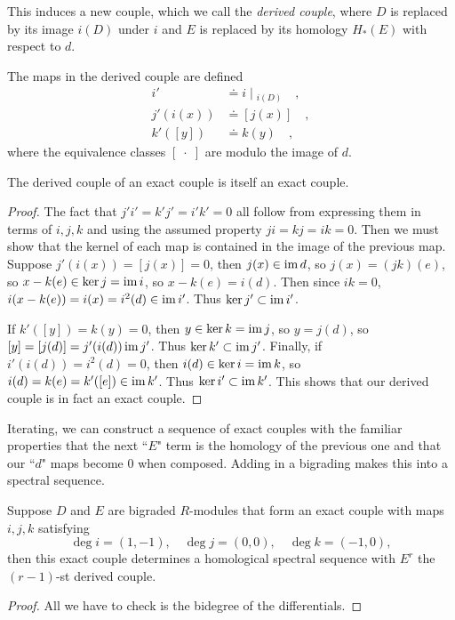 \documentclass[twoside,10pt]{article}
\begin{document}
This induces a new couple, which we call the \textit{derived couple}, where $D$ is replaced by its image $i(D)$ under $i$ and $E$ is replaced by its homology $H_*(E)$ with respect to $d$.
\begin{center}
\end{center}
The maps in the derived couple are defined
\begin{align*}
	i' &\doteq i \;|\;_{i(D)}\quad, \\
	j'(i(x)) &\doteq [j(x)]\quad, \\
	k'([y]) &\doteq k(y)\quad,
\end{align*}
where the equivalence classes $[\;\cdot\;]$ are modulo the image of $d$.

\begin{prop}
	The derived couple of an exact couple is itself an exact couple.
\end{prop}
\begin{proof}
	The fact that $j'i'=k'j'=i'k'=0$ all follow from expressing them in terms of $i,j,k$ and using the assumed property $ji=kj=ik=0$. Then we must show that the kernel of each map is contained in the image of the previous map. Suppose $j'(i(x))=[j(x)]=0$, then $j(x) \in \operatorname{im} d$, so $j(x)=(jk)(e)$, so $x-k(e) \in \ker j=\operatorname{im} i$, so $x-k(e)=i(d)$. Then since $ik=0$, $i(x-k(e))=i(x)=i^2(d) \in \operatorname{im} i'$. Thus $\ker j' \subset \operatorname{im} i'$.

	If $k'([y])=k(y)=0$, then $y\in \ker k=\operatorname{im} j$, so $y=j(d)$, so $[y]=[j(d)]=j'(i(d)) \operatorname{im} j'$. Thus $\ker k'\subset \operatorname{im} j'$. Finally, if $i'(i(d))=i^2(d)=0$, then $i(d) \in \ker i=\operatorname{im} k$, so $i(d)=k(e)=k'([e]) \in \operatorname{im} k'$. Thus $\ker i' \subset \operatorname{im} k'$. This shows that our derived couple is in fact an exact couple.
\end{proof}

Iterating, we can construct a sequence of exact couples with the familiar properties that the next ``$E$" term is the homology of the previous one and that our ``$d$" maps become 0 when composed. Adding in a bigrading makes this into a spectral sequence.

\begin{thrm}[]
	\label{thrm:ec2ss}
	Suppose $D$ and $E$ are bigraded $R$-modules that form an exact couple with maps $i,j,k$ satisfying
	\[
	\deg i=(1,-1), \quad \deg j=(0,0), \quad \deg k=(-1,0),
\] then this exact couple determines a homological spectral sequence with $E^{r}$ the $(r-1)$-st derived couple.
\end{thrm}
\begin{proof}
	{\color{red}All we have to check is the bidegree of the differentials.}
\end{proof}
\end{document}
